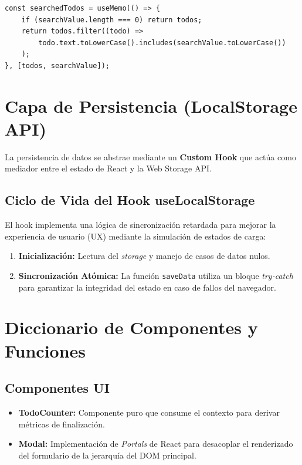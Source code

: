 \documentclass[12pt,a4paper]{report}
\begin{document}
\begin{lstlisting}[caption={Algoritmo de filtrado con normalización}]
const searchedTodos = useMemo(() => {
    if (searchValue.length === 0) return todos;
    return todos.filter((todo) =>
        todo.text.toLowerCase().includes(searchValue.toLowerCase())
    );
}, [todos, searchValue]);
\end{lstlisting}

\chapter{Capa de Persistencia (LocalStorage API)}

La persistencia de datos se abstrae mediante un \textbf{Custom Hook} que actúa como mediador entre el estado de React y la Web Storage API.

\section{Ciclo de Vida del Hook useLocalStorage}
El hook implementa una lógica de sincronización retardada para mejorar la experiencia de usuario (UX) mediante la simulación de estados de carga:
\begin{enumerate}
    \item \textbf{Inicialización:} Lectura del \textit{storage} y manejo de casos de datos nulos.
    \item \textbf{Sincronización Atómica:} La función \texttt{saveData} utiliza un bloque \textit{try-catch} para garantizar la integridad del estado en caso de fallos del navegador.
\end{enumerate}

\chapter{Diccionario de Componentes y Funciones}

\section{Componentes UI}
\begin{itemize}
    \item \textbf{TodoCounter:} Componente puro que consume el contexto para derivar métricas de finalización.
    \item \textbf{Modal:} Implementación de \textit{Portals} de React para desacoplar el renderizado del formulario de la jerarquía del DOM principal.
\end{itemize}
\end{document}
